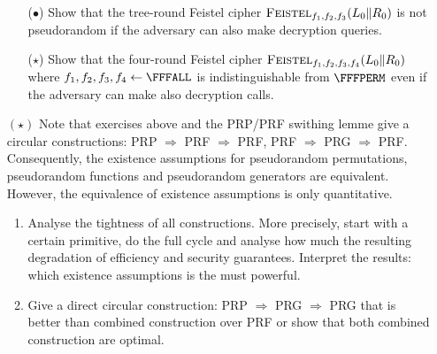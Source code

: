 \documentclass{article}
\begin{document}
\begin{enumerate}
\begin{enumerate}
  \item[($\bullet$)] Show that the tree-round Feistel cipher
    $\textsc{Feistel}_{f_1,f_2,f_3}(L_0\|R_0)$ is not pseudorandom if
    the adversary can also make decryption queries.
  \item [($\star$)] Show that the four-round Feistel cipher
    $\textsc{Feistel}_{f_1,f_2,f_3,f_4}(L_0\|R_0)$ where
    $f_1,f_2,f_3,f_4\gets\FFFALL$ is indistinguishable from $\FFFPERM$
    even if the adversary can make also decryption calls.
  \end{enumerate}
\item[$(\star)$] Note that exercises above and the PRP/PRF swithing
  lemme give a circular constructions: PRP $\Rightarrow$ PRF
  $\Rightarrow$ PRF, PRF $\Rightarrow$ PRG $\Rightarrow$
  PRF. Consequently, the existence assumptions for pseudorandom
  permutations, pseudorandom functions and pseudorandom generators are
  equivalent. However, the equivalence of existence assumptions is
  only quantitative.
  \begin{enumerate}
  \item Analyse the tightness of all constructions. More precisely,
    start with a certain primitive, do the full cycle and analyse how
    much the resulting degradation of efficiency and security
    guarantees. Interpret the results: which existence assumptions is
    the must powerful.
  \item Give a direct circular construction: PRP $\Rightarrow$ PRG
    $\Rightarrow$ PRG that is better than combined construction over
    PRF or show that both combined construction are optimal.
  \end{enumerate}
\end{enumerate}
\end{document}
